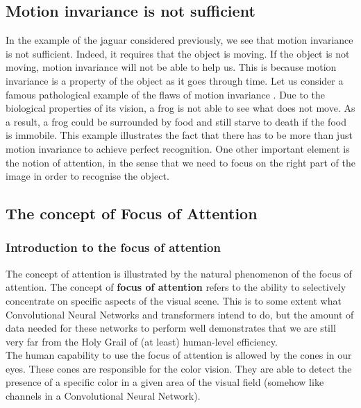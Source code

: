\documentclass[12pt]{article}
\begin{document}
\subsection{Motion invariance is not sufficient}
In the example of the jaguar considered previously, we see that motion invariance is not sufficient. Indeed, it requires that the object is moving. If the object is not moving, motion invariance will not be able to help us. This is because motion invariance is a property of the object as it goes through time. Let us consider a famous pathological example of the flaws of motion invariance \cite{gori2022}. Due to the biological properties of its vision, a frog is not able to see what does not move. As a result, a frog could be surrounded by food and still starve to death if the food is immobile. This example illustrates the fact that there has to be more than just motion invariance to achieve perfect recognition. One other important element is the notion of attention, in the sense that we need to focus on the right part of the image in order to recognise the object. 

\subsection{The concept of Focus of Attention}
\subsubsection{Introduction to the focus of attention}
The concept of attention is illustrated by the natural phenomenon of the focus of attention. The concept of \textbf{focus of attention} refers to the ability to selectively concentrate on specific aspects of the visual scene. This is to some extent what Convolutional Neural Networks \cite{lecun1995} and transformers \cite{vaswani2017} intend to do, but the amount of data needed for these networks to perform well demonstrates that we are still very far from the Holy Grail of (at least) human-level efficiency. \\
The human capability to use the focus of attention is allowed by the cones in our eyes. These cones are responsible for the color vision. They are able to detect the presence of a specific color in a given area of the visual field (somehow like channels in a Convolutional Neural Network).
\end{document}
